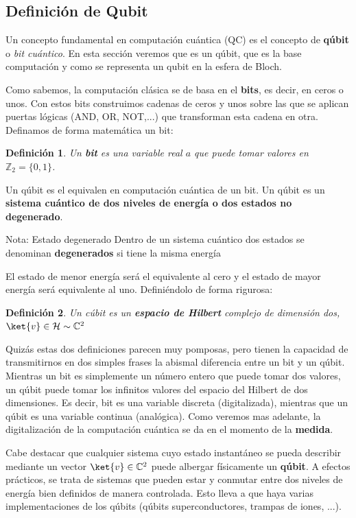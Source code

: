 \documentclass[a4paper,11pt]{book} %
\newtheorem{definicion_contador}{Definición}
\newcommand{\Definicion}[1]{
		\begin{mybox_gray2}{}
			\begin{definicion_contador}
				 #1 
			\end{definicion_contador} 
		\end{mybox_gray2}
	}
\numberwithin{equation}{chapter}
\begin{document}
        \subsection{Definición de Qubit}
Un concepto fundamental en computación cuántica (QC) es el concepto de \textbf{qúbit} o \textit{bit cuántico}.
En esta sección veremos que es un qúbit, que es la base computación y como se representa un qubit en la esfera de Bloch.


Como sabemos, la computación clásica se de basa en el \textbf{bits}, es decir, en ceros o unos. Con estos bits construimos cadenas de ceros y unos sobre las que se aplican puertas lógicas (AND, OR, NOT,...) que transforman esta cadena en otra. Definamos de forma matemática un bit:
	\Definicion{
	Un \textbf{bit} es una variable  real $a$ que puede tomar valores en $ {\mathbb Z}_2= \{0, 1\}$.
	}

Un qúbit es el equivalen en computación cuántica de un bit. Un qúbit es un \textbf{sistema cuántico de dos niveles de energía o dos estados no degenerado}. 
\begin{mybox_blue}{Nota: Estado degenerado}
Dentro de un sistema cuántico dos estados se denominan \textbf{degenerados} si tiene la misma energía
\end{mybox_blue}

El estado de menor energía será el equivalente al cero y el estado de mayor energía será equivalente al uno. Definiéndolo de forma rigurosa:
	\Definicion{
	Un cúbit es un \textbf{espacio de Hilbert} complejo de dimensión dos, $\ket{v} \in \mathcal{H} \sim  \mathbb{C}^2$
	}

Quizás estas dos definiciones parecen muy pomposas, pero tienen la capacidad de transmitirnos en dos simples frases la abismal diferencia entre un bit y un qúbit. Mientras un bit es simplemente un número entero que puede tomar dos valores, un qúbit puede tomar los infinitos valores del espacio del Hilbert de dos dimensiones. Es decir, bit es una variable discreta (digitalizada), mientras que un qúbit es una variable continua (analógica). Como veremos mas adelante, la digitalización de la computación cuántica se da en el momento de la \textbf{medida}.

Cabe destacar que cualquier sistema  cuyo estado instantáneo se pueda describir mediante un vector $\ket{v}\in {\mathbb C}^2$ puede albergar físicamente un \textbf{qúbit}. A efectos prácticos,  se trata de sistemas que pueden estar y conmutar entre dos niveles de energía bien definidos de manera controlada. Esto lleva a que haya varias implementaciones de los qúbits (qúbits superconductores, trampas de iones, ...). 
\end{document}
